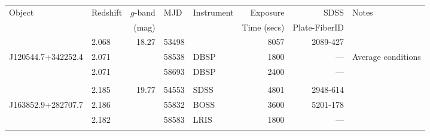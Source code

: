 \documentclass[fleqn,usenatbib]{mnras}
\begin{document}
\begin{table}
  \centering
  \begin{tabular}{l l   r ll  r r l}
    \hline 
    \hline 
    \multirow{2}{*}{Object} & \multirow{2}{*}{Redshift} & $g$-band & \multirow{2}{*}{MJD} & \multirow{3}{*}{Instrument} & Exposure      &   SDSS               & \multirow{2}{*}{Notes} \\
                                         &                                        &   (mag)      &                                 &                                             &  Time (secs) &   Plate-FiberID  & \\
    \hline  
                                       & 2.068                              & 18.27          &  53498                   & SDSS                                     &  8057            & 2089-427             & \\
 J120544.7+342252.4     & 2.071                             &                    &  58538                   & DBSP                                     &  1800            &  ---                      &  Average conditions \\
                                       & 2.071                             &                     &  58693                  & DBSP                                      &  2400            &  ---                      &          \\
                                       &                                       &                     &                               &                                              &                      &                               &                               \\
                                      & 2.185                              & 19.77           &  54553                   & SDSS                                     &   4801            &  2948-614              & \\
J163852.9+282707.7     & 2.186                              &                    &  55832                     & BOSS                                    &   3600            &  5201-178            & \\
                                      & 2.182                              &                     &  58583                     & LRIS                                    &  1800              &  ---                      & \\
                                      &                                         &                    &                                 &                                            &                      &                              &                                 \\

\end{tabular}
\end{table}
\end{document}
